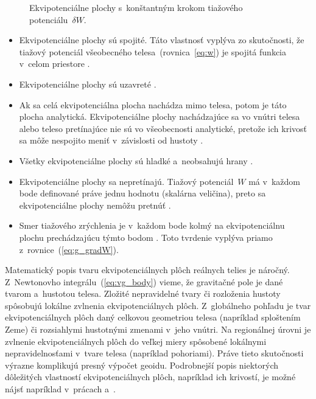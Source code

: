 \documentclass[a4paper, 12pt]{book}
\begin{document}
\begin{figure}[b!]
\centering

\caption{Ekvipotenciálne plochy s~konštantným krokom tiažového 
potenciálu~$\delta W$.}
\label{fig:equipotential_surfaces}
\end{figure}

\begin{itemize}
\item Ekvipotenciálne plochy sú spojité.  Táto vlastnosť vyplýva zo
skutočnosti, že tiažový potenciál všeobecného telesa~(rovnica~\ref{eq:w}) je 
spojitá funkcia v~celom priestore \parencite{MoritzPhysicalGeodesy}.

\item Ekvipotenciálne plochy sú uzavreté \parencite{VanicekGeodesy}.

\item Ak sa celá ekvipotenciálna plocha nachádza mimo telesa, potom je táto 
plocha analytická.  Ekvipotenciálne plochy nachádzajúce sa vo vnútri telesa 
alebo teleso pretínajúce nie sú vo všeobecnosti analytické, pretože ich krivosť 
sa môže nespojito meniť v~závislosti od hustoty 
\parencite{MoritzPhysicalGeodesy}.

\item Všetky ekvipotenciálne plochy sú hladké a~neobsahujú hrany
\parencite{MoritzPhysicalGeodesy}.

\item Ekvipotenciálne plochy sa nepretínajú.  Tiažový potenciál~$W$ má v~každom 
bode definované práve jednu hodnotu (skalárna veličina), preto sa 
ekvipotenciálne plochy nemôžu pretnúť \parencite{MacMillan1930}.

\item Smer tiažového zrýchlenia je v~každom bode kolmý na ekvipotenciálnu
plochu prechádzajúcu týmto bodom \parencite{MoritzPhysicalGeodesy}.  Toto 
tvrdenie vyplýva priamo z~rovnice~(\ref{eq:g_gradW}).
\end{itemize}

Matematický popis tvaru ekvipotenciálnych plôch reálnych telies je náročný.  
Z~Newtonovho integrálu~(\ref{eq:vg_body}) vieme, že gravitačné pole je dané 
tvarom a~hustotou telesa.  Zložité nepravidelné tvary či rozloženia hustoty 
spôsobujú lokálne zvlnenia ekvipotenciálnych plôch.  Z~globálneho pohľadu je 
tvar ekvipotenciálnych plôch daný celkovou geometriou telesa (napríklad 
sploštením Zeme) či rozsiahlymi hustotnými zmenami v~jeho vnútri.  Na 
regionálnej úrovni je zvlnenie ekvipotenciálnych plôch do veľkej miery 
spôsobené lokálnymi nepravidelnosťami v~tvare telesa (napríklad pohoriami).  
Práve tieto skutočnosti výrazne komplikujú presný výpočet geoidu.  Podrobnejší 
popis niektorých dôležitých vlastností ekvipotenciálnych plôch, napríklad ich 
krivostí, je možné nájsť napríklad v~prácach \textcite{MoritzPhysicalGeodesy} 
a~\textcite{Janak2006}.
\end{document}
